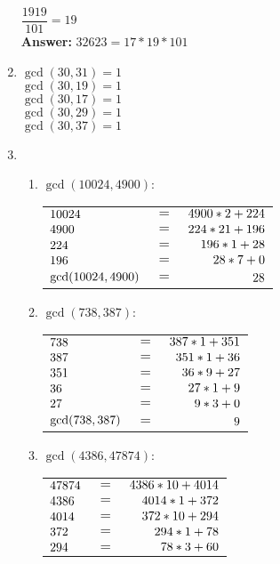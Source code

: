 \documentclass[8pt,a4paper]{article}
\begin{document}
\begin{enumerate}[itemsep=20pt]
	$\dfrac{1919}{101}=19$\\
	
	\textbf{Answer:} $32623=17*19*101$\\
\item
	$\gcd(30,31)=1$\\
	$\gcd(30,19)=1$\\
	$\gcd(30,17)=1$\\
	$\gcd(30,29)=1$\\
	$\gcd(30,37)=1$\\
\item
	\begin{enumerate}
		\item
			$\gcd(10024,4900):$\\
			\begin{tabular}[t]{l c r}
				\($$10024$$\) & \(=\) & \($$4900*2+224$$\)\\
				\($$4900$$\) & \(=\) & \($$224*21+196$$\)\\
				\($$224$$\) & \(=\) & \($$196*1+28$$\)\\
				\($$196$$\) & \(=\) & \($$28*7+0$$\)\\
				\($$\gcd(10024,4900)$$\) & \(=\) & \($$28$$\)\\
			\end{tabular}
		\item
			$\gcd(738,387):$\\
			\begin{tabular}[t]{l c r}
				\($$738$$\) & \(=\) & \($$387*1+351$$\)\\
				\($$387$$\) & \(=\) & \($$351*1+36$$\)\\
				\($$351$$\) & \(=\) & \($$36*9+27$$\)\\
				\($$36$$\) 	& \(=\) & \($$27*1+9$$\)\\
				\($$27$$\) 	& \(=\) & \($$9*3+0$$\)\\ 				
				\($$\gcd(738,387)$$\) & \(=\) & \($$9$$\)\\
			\end{tabular}
		\item
			$\gcd(4386,47874):$\\
			\begin{tabular}[t]{l c r}
				\($$47874$$\) & \(=\) & \($$4386*10+4014$$\)\\
				\($$4386$$\) & \(=\) & \($$4014*1+372$$\)\\
				\($$4014$$\) & \(=\) & \($$372*10+294$$\)\\
				\($$372$$\) & \(=\) & \($$294*1+78$$\)\\
				\($$294$$\) 	& \(=\) & \($$78*3+60$$\)\\

\end{tabular}
\end{enumerate}
\end{enumerate}
\end{document}
